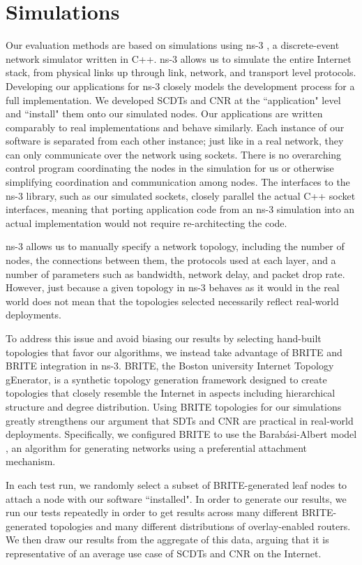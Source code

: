 \chapter{Simulations}
\label{simulations}
Our evaluation methods are based on simulations using ns-3 \cite{ns3}, a discrete-event network simulator written in C++. ns-3 allows us to simulate the entire Internet stack, from physical links up through link, network, and transport level protocols. Developing our applications for ns-3 closely models the development process for a full implementation. We developed SCDTs and CNR at the ``application" level and ``install" them onto our simulated nodes. Our applications are written comparably to real implementations and behave similarly. Each instance of our software is separated from each other instance; just like in a real network, they can only communicate over the network using sockets. There is no overarching control program coordinating the nodes in the simulation for us or otherwise simplifying coordination and communication among nodes. The interfaces to the ns-3 library, such as our simulated sockets, closely parallel the actual C++ socket interfaces, meaning that porting application code from an ns-3 simulation into an actual implementation would not require re-architecting the code.

ns-3 allows us to manually specify a network topology, including the number of nodes, the connections between them, the protocols used at each layer, and a number of parameters such as bandwidth, network delay, and packet drop rate. However, just because a given topology in ns-3 behaves as it would in the real world does not mean that the topologies selected necessarily reflect real-world deployments.

To address this issue and avoid biasing our results by selecting hand-built topologies that favor our algorithms, we instead take advantage of BRITE \cite{brite} and BRITE integration in ns-3. BRITE, the Boston university Internet Topology gEnerator, is a synthetic topology generation framework \cite{gtitm, inet} designed to create topologies that closely resemble the Internet in aspects including hierarchical structure and degree distribution. Using BRITE topologies for our simulations greatly strengthens our argument that SDTs and CNR are practical in real-world deployments. Specifically, we configured BRITE to use the Barab{\'a}si-Albert model \cite{BA_model}, an algorithm for generating networks using a preferential attachment mechanism.

In each test run, we randomly select a subset of BRITE-generated leaf nodes to attach a node with our software ``installed". In order to generate our results, we run our tests repeatedly in order to get results across many different BRITE-generated topologies and many different distributions of overlay-enabled routers. We then draw our results from the aggregate of this data, arguing that it is representative of an average use case of SCDTs and CNR on the Internet.

